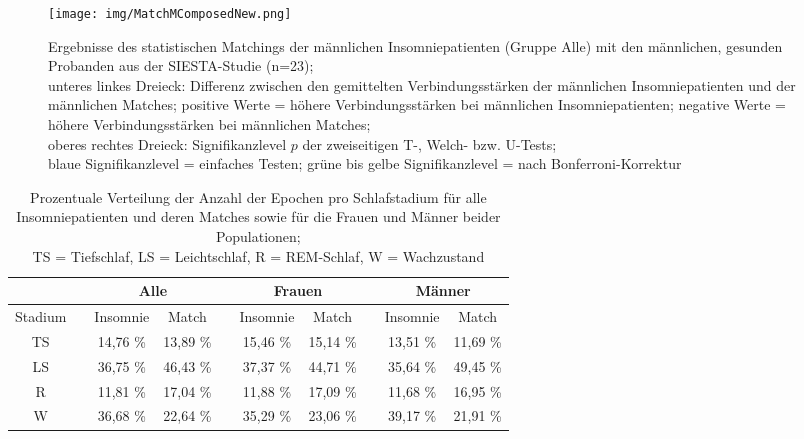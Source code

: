 \begin{figure}[H]
	\centering
	\texttt{[image: img/MatchMComposedNew.png]}
	\caption[Ergebnisse des statistischen Matchings der Insomniepatienten mit den gesunden Probanden]{Ergebnisse des statistischen Matchings der männlichen Insomniepatienten (Gruppe Alle) mit den männlichen, gesunden Probanden aus der SIESTA-Studie (n=23);\\unteres linkes Dreieck: Differenz zwischen den gemittelten Verbindungsstärken der männlichen Insomniepatienten und der männlichen Matches; positive Werte = höhere Verbindungsstärken bei männlichen Insomniepatienten; negative Werte = höhere Verbindungsstärken bei männlichen Matches;\\oberes rechtes Dreieck: Signifikanzlevel $p$ der zweiseitigen T-, Welch- bzw. U-Tests;\\blaue Signifikanzlevel = einfaches Testen; grüne bis gelbe Signifikanzlevel = nach Bonferroni-Korrektur}
	\label{fig:MatchMComposedNew}
\end{figure}




\begin{table}[H] 
\centering
\begin{tabularx}{0.96\textwidth}{cccccccccc}
\toprule
& & \multicolumn{2}{c}{\textbf{Alle}} & & \multicolumn{2}{c}{\textbf{Frauen}} & & \multicolumn{2}{c}{\textbf{Männer}}\\  
\midrule
Stadium & & Insomnie & Match & & Insomnie & Match & & Insomnie & Match\\
TS & & 14,76 \% & 13,89 \% & & 15,46 \% & 15,14 \% & & 13,51 \% & 11,69 \%\\
LS & & 36,75 \% & 46,43 \% & & 37,37 \% & 44,71 \% & & 35,64 \% & 49,45 \%\\
R & & 11,81 \% & 17,04 \% & & 11,88 \% & 17,09 \% & & 11,68 \% & 16,95 \%\\
W & & 36,68 \% & 22,64 \% & & 35,29 \% & 23,06 \% & & 39,17 \% & 21,91 \%\\
\bottomrule
\end{tabularx}
\caption[Prozentuale Verteilung der Schlafstadien]{Prozentuale Verteilung der Anzahl der Epochen pro Schlafstadium für alle Insomniepatienten und deren Matches sowie für die Frauen und Männer beider Populationen;\\TS = Tiefschlaf, LS = Leichtschlaf, R = \acs{REM}-Schlaf, W = Wachzustand}
\label{tab:nsis_insom_match}
\end{table}

\restoregeometry